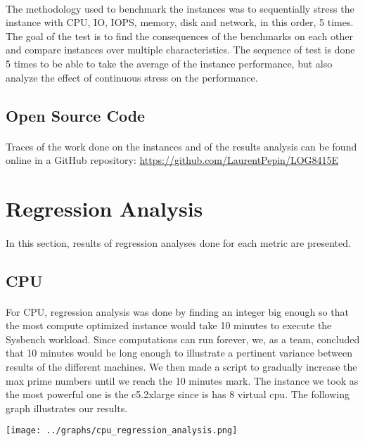 \documentclass[11pt]{article}
\begin{document}
		\paragraph{} The methodology used to benchmark the instances was to
		sequentially stress the instance with CPU, IO, IOPS, memory, disk and
		network, in this order, 5 times. The goal of the test is to find the
		consequences of the benchmarks on each other and compare instances over
		multiple characteristics. The sequence of test is done 5 times to be able to
		take the average of the instance performance, but also analyze the effect of
		continuous stress on the performance.
	\subsection{Open Source Code}
		\paragraph{} Traces of the work done on the instances and of the results
		analysis can be found online in a GitHub repository:
		\url{https://github.com/LaurentPepin/LOG8415E}\pagebreak

\section{Regression Analysis} \label{sec:regression_analysis}
	\paragraph{} In this section, results of regression analyses done for each
	metric are presented. 
	\subsection{CPU} 
		\paragraph{} For CPU, regression analysis was
		done by finding an integer big  enough so that the most compute optimized
		instance would take 10 minutes to execute the Sysbench workload. Since
		computations can run forever, we, as a team, concluded that 10 minutes would
		be long enough to illustrate a pertinent variance between results of the
		different machines.  We then made a script to gradually increase the max
		prime numbers until we reach the 10 minutes mark. The instance we took as
		the most powerful one is the c5.2xlarge since is has 8 virtual cpu. The
		following graph illustrates our results.
		\begin{center}
			\texttt{[image: ../graphs/cpu\_regression\_analysis.png]}
		\end{center}
\end{document}
